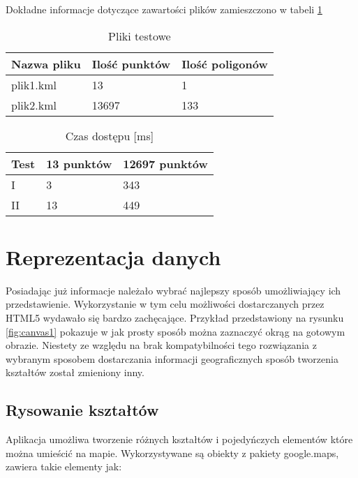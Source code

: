 Dokładne informacje dotyczące zawartości plików zamieszczono w tabeli \ref{tab:testFile}

\begin{table}[H]
    \centering
    \begin{tabular}{|l|l|l|}
    \hline
    Nazwa pliku & Ilość punktów & Ilość poligonów \\ \hline
    plik1.kml & 13 & 1 \\ \hline
    plik2.kml & 13697 & 133 \\ \hline

    \end{tabular}
    \caption{Pliki testowe}
    \label{tab:testFile}
\end{table}


\begin{table} [H]
    \centering
    \begin{tabular}{|l|l|l|}
    \hline
    Test & 13 punktów & 12697 punktów \\\hline
    I & 3 & 343 \\\hline
    II & 13 & 449 \\\hline

    \end{tabular}
    \caption{Czas dostępu [ms]}
    \label{tab:speedTest}
\end{table}



\section{Reprezentacja danych}
\label{sec:datareprezentaction}

Posiadając już informacje należało wybrać najlepszy sposób umożliwiający ich przedstawienie. Wykorzystanie w tym celu możliwości dostarczanych przez HTML5 wydawało się bardzo zachęcające. Przykład przedstawiony na rysunku \ref{fig:canvas1} pokazuje w jak prosty sposób można zaznaczyć okrąg na gotowym obrazie. Niestety ze względu na brak kompatybilności tego rozwiązania z wybranym sposobem dostarczania informacji geograficznych sposób tworzenia kształtów został zmieniony inny.

\subsection{Rysowanie kształtów}
\label{subsec:drawpoly}

Aplikacja umożliwa tworzenie różnych kształtów i pojedyńczych elementów które można umieścić na mapie. Wykorzystywane są obiekty z pakiety google.maps, zawiera takie elementy jak:

